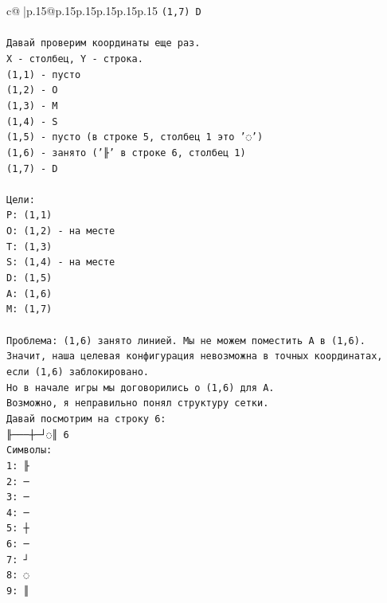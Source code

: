 \documentclass{article}
\begin{document}
{\begin{supertabular}{c@{$\;$}|p{.15\linewidth}@{}p{.15\linewidth}p{.15\linewidth}p{.15\linewidth}p{.15\linewidth}p{.15\linewidth}}
{{{\texttt{(1,7) D} \\
\\ 
\texttt{Давай проверим координаты еще раз.} \\
\texttt{X {-} столбец, Y {-} строка.} \\
\texttt{(1,1) {-} пусто} \\
\texttt{(1,2) {-} O} \\
\texttt{(1,3) {-} M} \\
\texttt{(1,4) {-} S} \\
\texttt{(1,5) {-} пусто (в строке 5, столбец 1 это '◌')} \\
\texttt{(1,6) {-} занято ('╟' в строке 6, столбец 1)} \\
\texttt{(1,7) {-} D} \\
\\ 
\texttt{Цели:} \\
\texttt{P: (1,1)} \\
\texttt{O: (1,2) {-} на месте} \\
\texttt{T: (1,3)} \\
\texttt{S: (1,4) {-} на месте} \\
\texttt{D: (1,5)} \\
\texttt{A: (1,6)} \\
\texttt{M: (1,7)} \\
\\ 
\texttt{Проблема: (1,6) занято линией. Мы не можем поместить A в (1,6).} \\
\texttt{Значит, наша целевая конфигурация невозможна в точных координатах, если (1,6) заблокировано.} \\
\texttt{Но в начале игры мы договорились о (1,6) для A.} \\
\texttt{Возможно, я неправильно понял структуру сетки.} \\
\texttt{Давай посмотрим на строку 6:} \\
\texttt{╟───┼─┘◌║ 6} \\
\texttt{Символы:} \\
\texttt{1: ╟} \\
\texttt{2: ─} \\
\texttt{3: ─} \\
\texttt{4: ─} \\
\texttt{5: ┼} \\
\texttt{6: ─} \\
\texttt{7: ┘} \\
\texttt{8: ◌} \\
\texttt{9: ║} \\
\\ 
}}}
\end{supertabular}}
\end{document}
